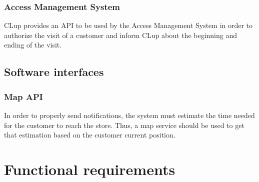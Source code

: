 \documentclass[a4paper,oneside,11pt]{book}   %
\begin{document}
    \subsubsection{Access Management System}
    CLup provides an API to be used by the Access Management System in order to authorize the visit of a customer and inform CLup about the beginning and ending of the visit.
    
    \subsection{Software interfaces}
    \subsubsection{Map API}
    In order to properly send notifications, the system must estimate the time needed for the customer to reach the store. Thus, a map service should be used to get that estimation based on the customer current position.
    
    \section{Functional requirements}
\end{document}
